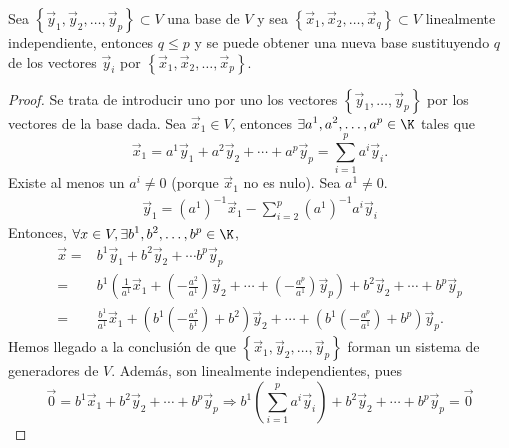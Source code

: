 \begin{ftheorem}
\normalfont Sea $\displaystyle \left\{ \vec{y}_{1}, \vec{y}_{2}, \ldots, \vec{y}_{p}\right\} \subset V $ una base de $\displaystyle V $ y sea $\displaystyle \left\{ \vec{x}_{1}, \vec{x}_{2}, \ldots, \vec{x}_{q}\right\} \subset V $ linealmente independiente, entonces $\displaystyle q \leq p $ y se puede obtener una nueva base sustituyendo $\displaystyle q $ de los vectores $\displaystyle \vec{y}_{i} $ por $\displaystyle \left\{ \vec{x}_{1}, \vec{x}_{2}, \ldots, \vec{x}_{p}\right\}  $.
\end{ftheorem}

\begin{proof}
	Se trata de introducir uno por uno los vectores $\displaystyle \left\{ \vec{y}_{1}, \ldots, \vec{y}_{p}\right\}  $ por los vectores de la base dada. 
Sea $\displaystyle \vec{x}_{1} \in V $, entonces $\displaystyle \exists a^{1}, a^{2}, \ldots, a^{p}\in \K $ tales que
\[\vec{x}_{1} = a^{1}\vec{y}_{1} + a^{2}\vec{y}_{2} + \cdots + a^{p}\vec{y}_{p} = \sum^{p}_{i=1}a^{i}\vec{y}_{i} .\]
Existe al menos un $\displaystyle a^{i} \neq 0 $ (porque $\displaystyle \vec{x}_{1} $ no es nulo). Sea $\displaystyle a^{1} \neq 0 $. 
\[
\begin{split}
	\vec{y}_{1} = \left(a^{1}\right)^{-1}\vec{x}_{1} - \sum^{p}_{i=2}\left(a^{1}\right)^{-1}a^{i}\vec{y}_{i}
\end{split}
\]
Entonces, $\displaystyle \forall x \in V, \exists b^{1}, b^{2}, \ldots, b^{p}\in\K $, 
\[
\begin{split}
	\vec{x} = & b^{1}\vec{y}_{1} + b^{2}\vec{y}_{2} + \cdots b^{p}\vec{y}_{p} \\
	= & b^{1} \left(\frac{1}{a^{1}}\vec{x}_{1} + \left(-\frac{a^{2}}{a^{1}}\right)\vec{y}_{2} + \cdots + \left(- \frac{a^{p}}{a^{1}}\right)\vec{y}_{p}\right) + b^{2}\vec{y}_{2} + \cdots + b^{p}\vec{y}_{p} \\
	= & \frac{b^{1}}{a^{1}} \vec{x}_{1} + \left(b^{1}\left(-\frac{a^{2}}{b^{1}}\right)+b^{2}\right)\vec{y}_{2} + \cdots + \left(b^{1}\left(-\frac{a^{p}}{a^{1}}\right)+b^{p}\right)\vec{y}_{p}.
\end{split}
\]
Hemos llegado a la conclusión de que $\displaystyle \left\{ \vec{x}_{1}, \vec{y}_{2}, \ldots, \vec{y}_{p}\right\}  $ forman un sistema de generadores de $\displaystyle V $. Además, son linealmente independientes, pues 
\[\vec{0} = b^{1}\vec{x}_{1} + b^{2}\vec{y}_{2} + \cdots + b^{p}\vec{y}_{p} \Rightarrow b^{1}\left(\sum^{p}_{i=1}a^{i}\vec{y}_{i}\right) + b^{2}\vec{y}_{2} + \cdots + b^{p}\vec{y}_{p} = \vec{0} \]

\end{proof}
